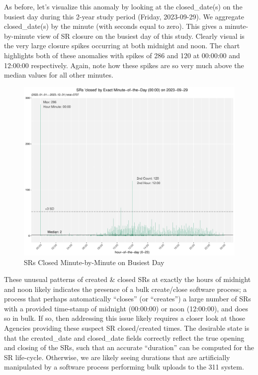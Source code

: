 \documentclass[12pt, titlepage]{article}
\begin{document}
{	As before, let's visualize this anomaly by looking at the closed\_date(s) 
	on the busiest day during this 2-year study period (Friday, 2023-09-29). 
	We aggregate closed\_date(s) by the minute (with seconds equal to zero). 
	This gives a minute-by-minute view of SR closure on the busiest day 
	of this study. Clearly visual is the very large closure spikes occurring at 
	both midnight and noon. The chart highlights both of these anomalies 
	with spikes of 286 and 120 at 00:00:00 and 12:00:00 respectively. 
	Again, note how these spikes are so very much above the median 
	values for all other minutes.

 	\begin{figure}[tbp]
		\centering
		\includegraphics[width=\textwidth]
		{2-year-trend-SR_closed_by_minute_of_busiest_day.pdf}
		\caption{SRs Closed Minute-by-Minute on Busiest Day}
		\label{fig:busiestclosed}
	\end{figure}	

	These unusual patterns of created \& closed SRs at exactly the hours 
	of midnight and noon likely indicates the presence of a bulk create/close 
	software process; a process that perhaps automatically ``closes'' 
	(or ``creates'') a large number of SRs with a provided time-stamp of 
	midnight (00:00:00) or noon (12:00:00), and does so in bulk. 
	If so, then addressing this issue likely requires a closer look at those 
	Agencies providing these suspect SR closed/created times. The desirable 
	state is that the created\_date and closed\_date fields correctly 
	reflect the true opening and closing of the SRs, such that an 
	accurate ``duration'' can be computed for the SR life-cycle. 
	Otherwise, we are likely seeing durations that are artificially 
	manipulated by a software process performing bulk uploads 
	to the 311 system.

}
\end{document}
